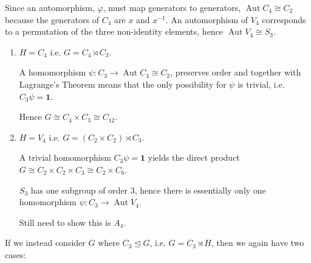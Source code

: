 \documentclass[a4paper, oneside, 12pt, final]{article}
\theoremstyle{definition}
\DeclareMathOperator{\Aut}{Aut}
\begin{document}
Since an automorphism, \(\varphi\), must map generators to generators,
\(\Aut{C_4} \cong C_2\) because the generators of \(C_4\) are \(x\) and
\(x^{-1}\).
An automorphism of \(V_4\) corresponds to a permutation of the three
non-identity elements, hence \(\Aut{V_4} \cong S_3\).

\begin{enumerate}
    \item \(H = C_4\) i.e. \(G = C_4 \rtimes C_3\).

        A homomorphism \(\psi:C_3 \to \Aut{C_4} \cong C_2\), preserves order
        and together with Lagrange's Theorem means that the only possibility
        for \(\psi\) is trivial, i.e. \(C_3\psi = \bm{1}\).

        Hence \(G \cong C_4 \times C_3 \cong C_{12}\).

    \item \(H = V_4\) i.e. \(G = (C_2 \times C_2) \rtimes C_3\).

        A trivial homomorphism \(C_3\psi = \bm{1}\) yields the direct product
        \(G \cong C_2 \times C_2 \times C_3 \cong C_2 \times C_6\).

        \(S_3\) has one subgroup of order 3, hence there is essentially only
        one homomorphism \(\psi:C_3 \to \Aut{V_4}\).

        Still need to show this is \(A_4\).
\end{enumerate}

If we instead consider \(G\) where \(C_3 \unlhd G\), i.e. \(G = C_3 \rtimes H\), then we again have two cases:
\end{document}
